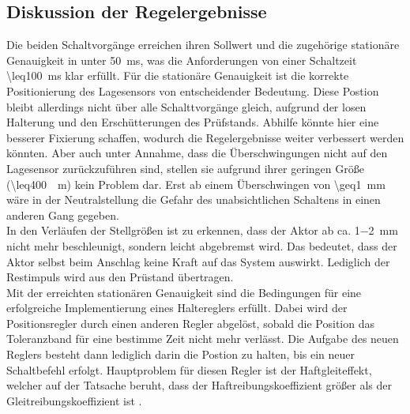 \subsection{Diskussion der Regelergebnisse}
Die beiden Schaltvorgänge erreichen ihren Sollwert und die zugehörige stationäre Genauigkeit in unter \SI{50}{ms}, was die Anforderungen von einer Schaltzeit \SI{\leq100}{ms} klar erfüllt. Für die stationäre Genauigkeit ist die korrekte Positionierung des Lagesensors von entscheidender Bedeutung. Diese Postion bleibt allerdings nicht über alle Schalttvorgänge gleich, aufgrund der losen Halterung und den Erschütterungen des Prüfstands. Abhilfe könnte hier eine besserer Fixierung schaffen, wodurch die Regelergebnisse weiter verbessert werden könnten. Aber auch unter Annahme, dass die Überschwingungen nicht auf den Lagesensor zurückzuführen sind, stellen sie aufgrund ihrer geringen Größe (\SI{\leq400}{\mu m}) kein Problem dar. Erst ab einem Überschwingen von \SI{\geq1}{mm} wäre in der Neutralstellung die Gefahr des unabsichtlichen Schaltens in einen anderen Gang gegeben.\\
In den Verläufen der Stellgrößen ist zu erkennen, dass der Aktor ab ca. \SI{1-2}{mm} nicht mehr beschleunigt, sondern leicht abgebremst wird. Das bedeutet, dass der Aktor selbst beim Anschlag keine Kraft auf das System auswirkt. Lediglich der Restimpuls wird aus den Prüstand übertragen.\\
Mit der erreichten stationären Genauigkeit sind die Bedingungen für eine erfolgreiche Implementierung eines Haltereglers erfüllt. Dabei wird der Positionsregler durch einen anderen Regler abgelöst, sobald die Position das Toleranzband für eine bestimme Zeit nicht mehr verlässt. Die Aufgabe des neuen Reglers besteht dann lediglich darin die Postion zu halten, bis ein neuer Schaltbefehl erfolgt. Hauptproblem für diesen Regler ist der Haftgleiteffekt, welcher auf der Tatsache beruht, dass der Haftreibungskoeffizient größer als der Gleitreibungskoeffizient ist \cite{Bowden2001}. 

